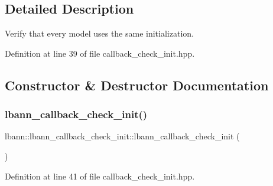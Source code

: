 \subsection{Detailed Description}
Verify that every model uses the same initialization. 

Definition at line 39 of file callback\+\_\+check\+\_\+init.\+hpp.



\subsection{Constructor \& Destructor Documentation}
\mbox{\label{classlbann_1_1lbann__callback__check__init_a3910da2c4e972567d79e5e414404a3da}} 
\subsubsection{\texorpdfstring{lbann\+\_\+callback\+\_\+check\+\_\+init()}{lbann\_callback\_check\_init()}\hspace{0.1cm}{\footnotesize\ttfamily [1/2]}}
{\footnotesize\ttfamily lbann\+::lbann\+\_\+callback\+\_\+check\+\_\+init\+::lbann\+\_\+callback\+\_\+check\+\_\+init (\begin{DoxyParamCaption}{ }\end{DoxyParamCaption})\hspace{0.3cm}{\ttfamily [inline]}}



Definition at line 41 of file callback\+\_\+check\+\_\+init.\+hpp.


